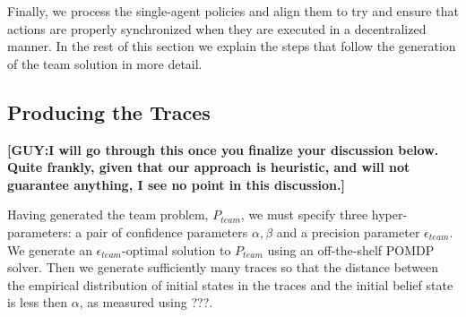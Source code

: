 \documentclass[letterpaper]{article} %
\theoremstyle{definition}
\newcommand{\eliran}[1]{\textbf{[\color{red}ELIRAN:#1]}}
\newcommand{\guy}[1]{\textbf{[\color{orange}GUY:#1]}}
\begin{document}
Finally, we process the single-agent policies and align them to try and ensure that actions are properly synchronized when they are executed in a decentralized manner. 
In the rest of this section we explain the steps that follow the
generation of the team solution in more detail.



\subsection{Producing the Traces}


\guy{I will go through this once you finalize your discussion below. Quite frankly, given that our approach is heuristic, and will not guarantee anything, I see no point in this discussion.}

Having generated the team problem, $P_{team}$, we 
must specify three hyper-parameters: a pair of confidence parameters $\alpha, \beta$ and a precision parameter $\epsilon_{team}$. We generate an $\epsilon_{team}$-optimal solution
to $P_{team}$ using an off-the-shelf POMDP solver.
Then we generate sufficiently many traces so that the distance between the
empirical distribution of initial states in the traces and the initial belief state is less then $\alpha$,
as measured using ???.
\end{document}

